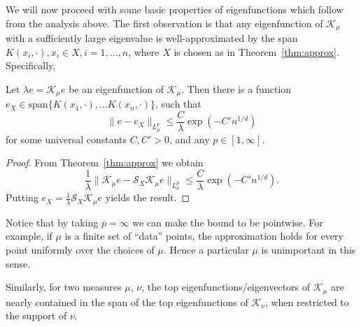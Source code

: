 \documentclass[final,12pt]{colt2018}
\newcommand{\K}{\mathcal{K_\mu}}
\newcommand{\Kn}{\mathcal{K_\nu}}
\newcommand{\LpL}{{L^p_\mu}}
\renewcommand{\S}{{\mathcal S}}
\begin{document}
 We will now proceed with some basic properties of eigenfunctions which follow from the analysis above. The first observation is that any eigenfunction of  $\K$ with a sufficiently large eigenvalue is well-approximated by the span $K(x_i,\cdot), x_i \in X, i=1,\ldots,n$, where $X$ is chosen as in Theorem~\ref{thm:approx}.  Specifically,
\begin{corollary} Let $\lambda e = \K e$  be an eigenfunction of $\K$. Then there is a function $e_X \in  \mathrm{span}\{K(x_1,\cdot),\ldots K(x_n,\cdot)\}$, such that 
$$
\|e - e_X \|_\LpL  \le  \frac{C}{\lambda}  \exp(-C' n^{1/d})
$$
for some universal constants $C,C'>0$, and any $p \in [1,\infty]$. 
\end{corollary}
\begin{proof}
From Theorem~\ref{thm:approx} we obtain
$$
\frac{1}{\lambda} \|\K e - \S_X \K e \|_\LpL  \le  \frac{C}{\lambda}  \exp(-C' n^{1/d}).
$$ Putting $e_X =  \frac{1}{\lambda} \S_X \K e$ yields the result.
\end{proof}
\begin{remark}
Notice that by taking $p = \infty$ we can make the bound to be pointwise. For example, if $\mu$ is a finite set of ``data'' points,  the approximation holds for  every point uniformly over the choices of $\mu$.  Hence a particular $\mu$ is unimportant in this sense. 
\end{remark}
Similarly, for two measures $\mu$, $\nu$,  the top eigenfunctions/eigenvectors of $\K$ are  nearly contained in the span of the top eigenfunctions of $\Kn$, when restricted to the support of $\nu$. 
\end{document}
